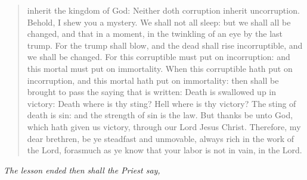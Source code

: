 \documentclass[
]{book}
\begin{document}
\begin{quote}
inherit the kingdom of God: Neither doth corruption inherit uncorruption. Behold, I shew you a mystery. We shall not all sleep: but we shall all be changed, and that in a moment, in the twinkling of an eye by the last trump. For the trump shall blow, and the dead shall rise incorruptible, and we shall be changed. For this corruptible must put on incorruption: and this mortal must put on immortality. When this corruptible hath put on incorruption, and this mortal hath put on immortality: then shall be brought to pass the saying that is written: Death is swallowed up in victory: Death where is thy sting? Hell where is thy victory? The sting of death is sin: and the strength of sin is the law. But thanks be unto God, which hath given us victory, through our Lord Jesus Christ. Therefore, my dear brethren, be ye steadfast and unmovable, always rich in the work of the Lord, forasmuch as ye know that your labor is not in vain, in the Lord.
\end{quote}

\emph{The lesson ended then shall the Priest say,}
\end{document}

